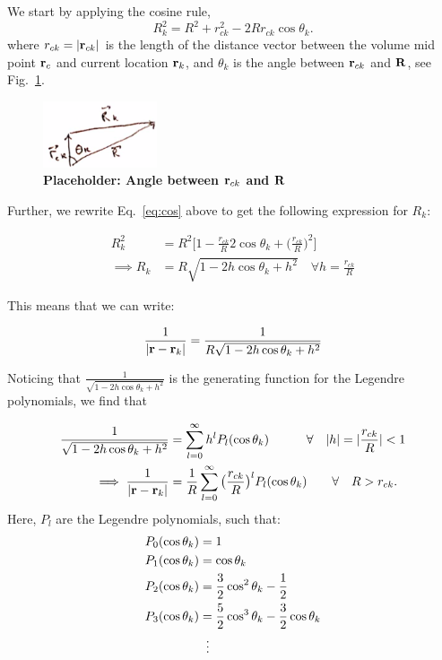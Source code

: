 We start by applying the cosine rule,
\begin{equation}\label{eq:cos}
R_k^2 = R^2 + r_{ck}^2 - 2 R r_{ck} \cos \theta_k.
\end{equation}
where $r_{ck} = |{\bf r}_{ck}|$ is the length of the distance vector between the volume mid point ${\bf r}_c$ and current location ${\bf r}_k$, and $\theta_k$ is the angle between ${\bf r}_{ck}$ and ${\bf R}$, see Fig.~\ref{fig:theta_k}.

\begin{figure}[!ht]
	\begin{center}
		\includegraphics[width=0.3\textwidth]{Figures/placeholder_appB2.png}
	\end{center}
	\caption{\textbf{Placeholder: Angle between ${\bf r}_{ck}$ and ${\bf R}$}}
	\label{fig:theta_k}
\end{figure}

Further, we rewrite Eq.~\ref{eq:cos} above to get the following expression for $R_k$:

\begin{align*}
R_k^2 &= R^2\big[1 -  \frac{r_{ck}}{R} 2 \cos \theta_k + \big(\frac{r_{ck}}{R}\big)^2  \big] \\
\implies R_k &= R\sqrt{1 - 2 h \cos \theta_k + h^2} \quad \forall h = \frac{r_{ck}}{R}
\end{align*}

%
This means that we can write:

\begin{equation*}
\frac{1}{|{\bf r} - {\bf r}_k|} = \frac{1}{R\sqrt{1 - 2 h \cos \theta_k + h^2}}
\end{equation*}

Noticing that $\frac{1}{\sqrt{1 - 2 h \cos \theta_k + h^2}}$ is the generating function for the Legendre polynomials, we find that

\begin{align*}\label{eq:legendre}
\frac{1}{\sqrt{1 - 2h\cos \theta_k + h^2}} &= \sum_{l = 0}^\infty h^l P_l(\cos \theta_k) \quad \quad \quad \forall \quad |h| = |\frac{r_{ck}}{R}| < 1 \\
\implies \frac{1}{|{\bf r} - {\bf r}_k|} &= \frac{1}{R} \sum_{l = 0}^\infty \big(\frac{r_{ck}}{R}\big)^l P_l(\cos \theta_k) \quad \quad \forall \quad R > r_{ck}.
\end{align*}
Here, $P_l$  are the Legendre polynomials, such that:
\begin{align*}
P_0 (\cos \theta_k) &= 1 \\
P_1 (\cos \theta_k) &= \cos \theta_k \\
P_2 (\cos \theta_k) &= \frac{3}{2} \cos^2 \theta_k - \frac{1}{2} \\
P_3 (\cos \theta_k) &= \frac{5}{2} \cos^3 \theta_k - \frac{3}{2}\cos \theta_k \\
&\;\;\vdots \notag
\end{align*}

